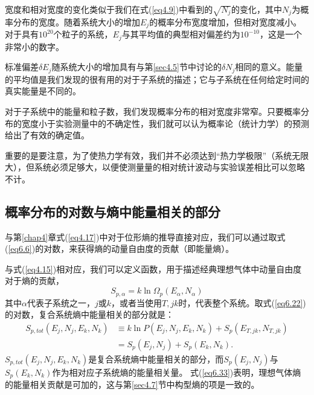 \documentclass[UTF8]{ctexart}
\numberwithin{equation}{section}%
\numberwithin{figure}{section}%
\begin{document}
    宽度和相对宽度的变化类似于我们在式(\ref{eq4.9})中看到的$\sqrt{N_j}$的变化，其中$N_j$为概率分布的宽度。随着系统大小的增加$E_j$的概率分布宽度增加，但相对宽度减小。对于具有$10^{20}$个粒子的系统，$E_j$与其平均值的典型相对偏差约为$10^{-10}$，这是一个非常小的数字。
    
    标准偏差$\delta E_j$随系统大小的增加具有与第\ref{sec4.5}节中讨论的$\delta N_j$相同的意义。能量的平均值是我们发现的很有用的对于子系统的描述；它与子系统在任何给定时间的真实能量是不同的。

    对于子系统中的能量和粒子数，我们发现概率分布的相对宽度非常窄。只要概率分布的宽度小于实验测量中的不确定性，我们就可以认为概率论（统计力学）的预测给出了有效的确定值。

    重要的是要注意，为了使热力学有效，我们并不必须达到“热力学极限”（系统无限大），但系统必须足够大，以便使测量量的相对统计波动与实验误差相比可以忽略不计。
    
    \subsection{概率分布的对数与熵中能量相关的部分}
    与第\ref{chap4}章式(\ref{eq4.17})中对于位形熵的推导直接对应，我们可以通过取式(\ref{eq6.6})的对数，来获得熵的动量自由度的贡献（即能量熵）。

    与式(\ref{eq4.15})相对应，我们可以定义函数，用于描述经典理想气体中动量自由度对于熵的贡献，
    \begin{equation}\label{eq6.32}
        S_{p, \alpha}=k \ln \Omega_{p}\left(E_{\alpha}, N_{\alpha}\right)
    \end{equation}
    其中$\alpha$代表子系统之一，$j$或$k$，或者当使用$T,jk$时，代表整个系统。取式(\ref{eq6.22})的对数，复合系统熵中能量相关的部分就是：
    \begin{equation}\label{eq6.33}
        \begin{aligned}
            S_{p, t o t}\left(E_{j}, N_{j}, E_{k}, N_{k}\right) & \equiv k \ln P\left(E_{j}, N_{j}, E_{k}, N_{k}\right)+S_{p}\left(E_{T, j k}, N_{T, j k}\right) \\
            &=S_{p}\left(E_{j}, N_{j}\right)+S_{p}\left(E_{k}, N_{k}\right) .
            \end{aligned}
    \end{equation}
    $S_{p, t o t}\left(E_{j}, N_{j}, E_{k}, N_{k}\right)$是复合系统熵中能量相关的部分，而$S_{p}\left(E_{j}, N_{j}\right)$与$S_{p}\left(E_{k}, N_{k}\right)$作为相对应子系统熵的能量相关量。
    式(\ref{eq6.33})表明，理想气体熵的能量相关贡献是可加的，这与第\ref{sec4.7}节中构型熵的项是一致的。
\end{document}

